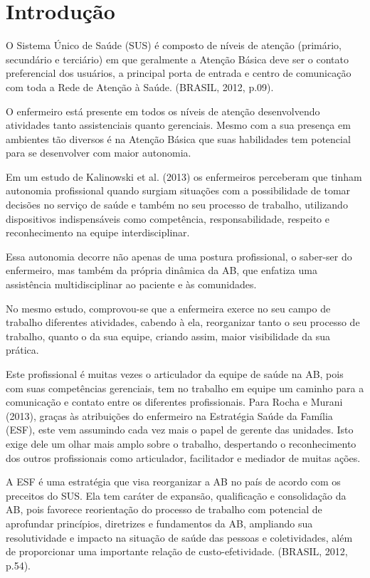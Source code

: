 \chapter{Introdução}
\label{cap:introducao}

O Sistema Único de Saúde (SUS) é composto de níveis de atenção (primário, secundário e terciário) em que geralmente a Atenção Básica deve ser o contato preferencial dos usuários, a principal porta de entrada e centro de comunicação com toda a Rede de Atenção à Saúde. (BRASIL, 2012, p.09).

O enfermeiro está presente em todos os  níveis de atenção desenvolvendo atividades tanto assistenciais quanto gerenciais. Mesmo com a sua presença em ambientes tão diversos é na Atenção Básica que suas habilidades tem potencial para se desenvolver com maior autonomia. 

Em um estudo de Kalinowski et al. (2013) os enfermeiros perceberam que tinham autonomia profissional quando surgiam situações com a possibilidade de tomar decisões no serviço de saúde e também no seu processo de trabalho, utilizando dispositivos indispensáveis como competência, responsabilidade, respeito e reconhecimento na equipe interdisciplinar.

Essa autonomia decorre não apenas de uma postura profissional, o saber-ser do enfermeiro, mas também da própria dinâmica da AB, que enfatiza uma assistência multidisciplinar ao paciente e às comunidades. 

No mesmo estudo, comprovou-se que a enfermeira exerce no seu campo de trabalho diferentes atividades, cabendo à ela, reorganizar tanto o seu processo de trabalho, quanto  o da sua equipe, criando assim, maior visibilidade da sua prática. 

Este profissional é muitas vezes o articulador da equipe de saúde na AB, pois com suas competências gerenciais, tem no trabalho em equipe um caminho para a comunicação e contato entre os diferentes profissionais. Para Rocha e Murani (2013), graças às atribuições do enfermeiro na Estratégia Saúde da Família (ESF), este vem assumindo cada vez mais o papel de gerente das unidades. Isto exige dele um olhar mais amplo sobre o trabalho, despertando o reconhecimento dos outros profissionais como articulador, facilitador e mediador de muitas ações. 

A ESF é uma estratégia que visa reorganizar a AB no país de acordo com os preceitos do SUS. Ela tem caráter de expansão, qualificação e consolidação da AB, pois favorece reorientação do processo de trabalho com potencial de aprofundar princípios, diretrizes e fundamentos da AB, ampliando sua resolutividade e impacto na situação de saúde das pessoas e coletividades, além de proporcionar uma importante relação de custo-efetividade. (BRASIL, 2012, p.54).

